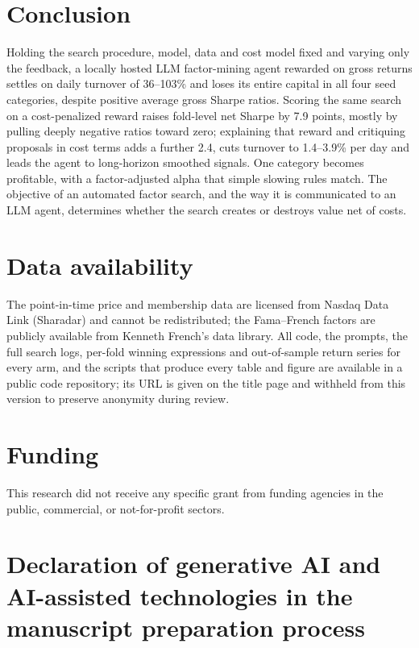 \documentclass[preprint,12pt,authoryear]{elsarticle}
\begin{document}
\section{Conclusion}\label{sec:conclusion}

Holding the search procedure, model, data and cost model fixed and varying only the feedback, a locally hosted LLM factor-mining agent rewarded on gross returns settles on daily turnover of 36--103\% and loses its entire capital in all four seed categories, despite positive average gross Sharpe ratios. Scoring the same search on a cost-penalized reward raises fold-level net Sharpe by 7.9 points, mostly by pulling deeply negative ratios toward zero; explaining that reward and critiquing proposals in cost terms adds a further 2.4, cuts turnover to 1.4--3.9\% per day and leads the agent to long-horizon smoothed signals. One category becomes profitable, with a factor-adjusted alpha that simple slowing rules match. The objective of an automated factor search, and the way it is communicated to an LLM agent, determines whether the search creates or destroys value net of costs.

\section*{Data availability}

The point-in-time price and membership data are licensed from Nasdaq Data Link (Sharadar) and cannot be redistributed; the Fama--French factors are publicly available from Kenneth French's data library. All code, the prompts, the full search logs, per-fold winning expressions and out-of-sample return series for every arm, and the scripts that produce every table and figure are available in a public code repository; its URL is given on the title page and withheld from this version to preserve anonymity during review.

\section*{Funding}

This research did not receive any specific grant from funding agencies in the public, commercial, or not-for-profit sectors.

\section*{Declaration of generative AI and AI-assisted technologies in the manuscript preparation process}
\end{document}
